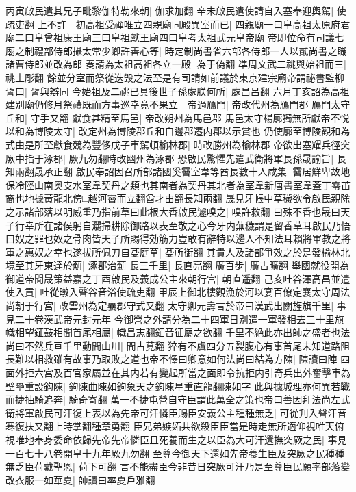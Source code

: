丙寅啟民遣其兄子毗黎伽特勒來朝|{
	伽求加翻}
辛未啟民遣使請自入塞奉迎輿駕|{
	使疏吏翻}
上不許　初高祖受禪唯立四親廟同殿異室而已|{
	四親廟一曰皇高祖太原府君廟二曰皇曾祖康王廟三曰皇祖獻王廟四曰皇考太祖武元皇帝廟}
帝即位命有司議七廟之制禮部侍郎攝太常少卿許善心等|{
	時定制尚書省六部各侍郎一人以貳尚書之職諸曹侍郎並改為郎}
奏請為太祖高祖各立一殿|{
	為于偽翻}
凖周文武二祧與始祖而三|{
	祧土彫翻}
餘並分室而祭從迭毁之法至是有司請如前議於東京建宗廟帝謂祕書監柳䛒曰|{
	䛒與辯同}
今始祖及二祧已具後世子孫處朕何所|{
	處昌呂翻}
六月丁亥詔為高祖建别廟仍修月祭禮既而方事巡幸竟不果立　帝過鴈門|{
	帝改代州為鴈門郡}
鴈門太守丘和|{
	守手又翻}
獻食甚精至馬邑|{
	帝改朔州為馬邑郡}
馬邑太守楊廓獨無所獻帝不悦以和為博陵太守|{
	改定州為博陵郡丘和自邊郡遷内郡以示賞也}
仍使廓至博陵觀和為式由是所至獻食競為豐侈戊子車駕頓榆林郡|{
	時改勝州為榆林郡}
帝欲出塞耀兵徑突厥中指于涿郡|{
	厥九勿翻時改幽州為涿郡}
恐啟民驚懼先遣武衛將軍長孫晟諭旨|{
	長知兩翻晟承正翻}
啟民奉詔因召所部諸國奚霫室韋等酋長數十人咸集|{
	霫居鮮卑故地保冷陘山南奥支水室韋契丹之類也其南者為契丹其北者為室韋新唐書室韋蓋丁零苖裔也地據黃龍北傍□越河霫而立翻酋才由翻長知兩翻}
晟見牙帳中草穢欲令啟民親除之示諸部落以明威重乃指前草曰此根大香啟民遽嗅之|{
	嗅許救翻}
曰殊不香也晟曰天子行幸所在諸侯躬自灑掃耕除御路以表至敬之心今牙内蕪穢謂是留香草耳啟民乃悟曰奴之罪也奴之骨肉皆天子所賜得効筋力豈敢有辭特以邊人不知法耳賴將軍教之將軍之惠奴之幸也遂拔所佩刀自芟庭草|{
	芟所衘翻}
其貴人及諸部爭效之於是發榆林北境至其牙東達於薊|{
	涿郡治薊}
長三千里|{
	長直亮翻}
廣百步|{
	廣古曠翻}
舉國就役開為御道帝聞晟策益嘉之丁酉啟民及義成公主來朝行宫|{
	朝直遥翻}
己亥吐谷渾高昌並遣使入貢|{
	吐從暾入聲谷音浴使疏吏翻}
甲辰上御北樓觀漁於河以宴百僚定襄太守周法尚朝于行宫|{
	改雲州為定襄郡守式又翻}
太守卿元壽言於帝曰漢武出關旌旗千里|{
	事見二十卷漢武帝元封元年}
今御營之外請分為二十四軍日别遣一軍發相去三十里旗幟相望鉦鼓相聞首尾相屬|{
	幟昌志翻鉦音征屬之欲翻}
千里不絶此亦出師之盛者也法尚曰不然兵亘千里動間山川|{
	間古莧翻}
猝有不虞四分五裂腹心有事首尾未知道路阻長難以相救雖有故事乃取敗之道也帝不懌曰卿意如何法尚曰結為方陳|{
	陳讀曰陣}
四面外拒六宫及百官家屬並在其内若有變起所當之面即令抗拒内引奇兵出外奮擊車為壁壘重設鈎陳|{
	鉤陳曲陳如鉤象天之鉤陳星重直龍翻陳如字}
此與據城理亦何異若戰而捷抽騎追奔|{
	騎奇寄翻}
萬一不捷屯營自守臣謂此萬全之策也帝曰善因拜法尚左武衛將軍啟民可汗復上表以為先帝可汗憐臣賜臣安義公主種種無乏|{
	可從刋入聲汗音寒復扶又翻上時掌翻種章勇翻}
臣兄弟嫉妬共欲殺臣臣當是時走無所適仰視唯天俯視唯地奉身委命依歸先帝先帝憐臣且死養而生之以臣為大可汗還撫突厥之民|{
	事見一百七十八卷開皇十九年厥九勿翻}
至尊今御天下還如先帝養生臣及突厥之民種種無乏臣荷戴聖恩|{
	荷下可翻}
言不能盡臣今非昔日突厥可汗乃是至尊臣民願率部落變改衣服一如華夏|{
	帥讀曰率夏戶雅翻}
